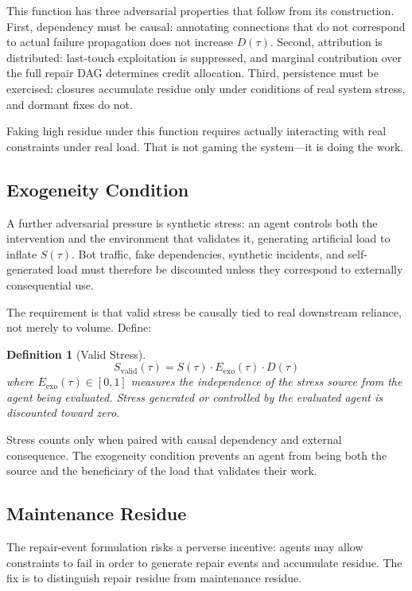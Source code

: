 \documentclass[12pt]{article}
\newtheorem{definition}{Definition}
\begin{document}
This function has three adversarial properties that follow from its
construction. First, dependency must be causal: annotating connections
that do not correspond to actual failure propagation does not increase
$D(\tau)$. Second, attribution is distributed: last-touch exploitation
is suppressed, and marginal contribution over the full repair DAG
determines credit allocation. Third, persistence must be exercised:
closures accumulate residue only under conditions of real system stress,
and dormant fixes do not.

Faking high residue under this function requires actually interacting
with real constraints under real load. That is not gaming the
system---it is doing the work.

\subsection{Exogeneity Condition}

A further adversarial pressure is synthetic stress: an agent controls
both the intervention and the environment that validates it, generating
artificial load to inflate $S(\tau)$. Bot traffic, fake dependencies,
synthetic incidents, and self-generated load must therefore be
discounted unless they correspond to externally consequential use.

The requirement is that valid stress be causally tied to real downstream
reliance, not merely to volume. Define:

\begin{definition}[Valid Stress]
\[
  S_{\mathrm{valid}}(\tau) = S(\tau) \cdot E_{\mathrm{exo}}(\tau) \cdot D(\tau)
\]
where $E_{\mathrm{exo}}(\tau) \in [0,1]$ measures the independence of
the stress source from the agent being evaluated. Stress generated or
controlled by the evaluated agent is discounted toward zero.
\end{definition}

Stress counts only when paired with causal dependency and external
consequence. The exogeneity condition prevents an agent from being both
the source and the beneficiary of the load that validates their work.

\subsection{Maintenance Residue}

The repair-event formulation risks a perverse incentive: agents may
allow constraints to fail in order to generate repair events and
accumulate residue. The fix is to distinguish repair residue from
maintenance residue.
\end{document}
